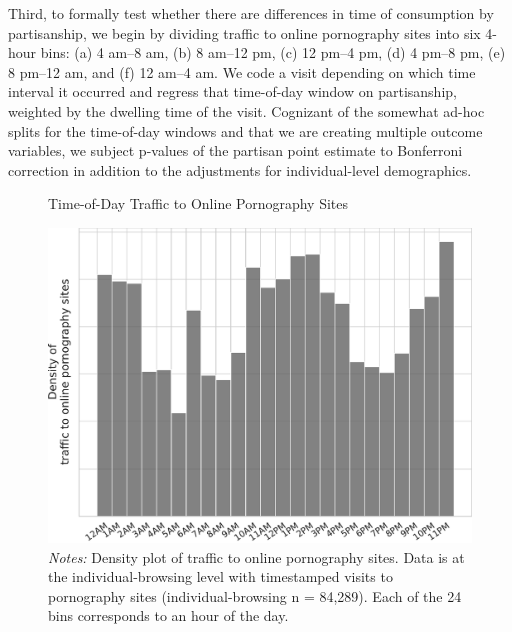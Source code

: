 \documentclass[12pt,twoside]{article}
\begin{document}
Third, to formally test whether there are differences in time of consumption by partisanship, we begin by dividing traffic to online pornography sites into six 4-hour bins: (a) 4 am--8 am, (b) 8 am--12 pm, (c) 12 pm--4 pm, (d) 4 pm--8 pm, (e) 8 pm--12 am, and (f) 12 am--4 am. We code a visit depending on which time interval it occurred and regress that time-of-day window on partisanship, weighted by the dwelling time of the visit. Cognizant of the somewhat ad-hoc splits for the time-of-day windows and that we are creating multiple outcome variables, we subject p-values of the partisan point estimate to Bonferroni correction in addition to the adjustments for individual-level demographics.

\begin{figure}[ht]
\centering
\caption{Time-of-Day Traffic to Online Pornography Sites}
    \includegraphics[width=.75\linewidth]{figs/time-of-day-consumption.pdf}
\caption*{\footnotesize \emph{Notes:} 
        Density plot of traffic to online pornography sites.
        Data is at the individual-browsing level with timestamped visits to pornography sites (individual-browsing n = 84,289).
        Each of the 24 bins corresponds to an hour of the day.
	}
    \label{fig:time-of-day-consumption}
\end{figure}
\end{document}
